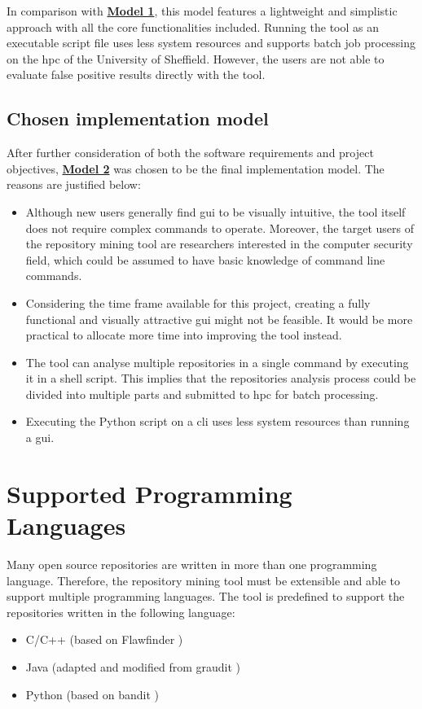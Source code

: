 \documentclass[12pt, a4paper]{report}
\begin{document}
In comparison with \hyperref[subsec:model1]{\textbf{Model 1}}, this model features a lightweight and
simplistic approach with all the core functionalities included. Running the tool as an executable
script file uses less system resources and supports batch job processing on the \acrshort{hpc} of
the University of Sheffield. However, the users are not able to evaluate false positive results
directly with the tool.

\subsection{Chosen implementation model} \label{subsec:chosen_model}
After further consideration of both the software requirements and project objectives,
\hyperref[subsec:model2]{\textbf{Model 2}} was chosen to be the final implementation model. The
reasons are justified below:
\begin{itemize}
  \item Although new users generally find \acrshort{gui} to be visually intuitive, the tool itself
  does not require complex commands to operate. Moreover, the target users of the repository mining
  tool are researchers interested in the computer security field, which could be assumed to have
  basic knowledge of command line commands.
  \item Considering the time frame available for this project, creating a fully functional and
  visually attractive \acrshort{gui} might not be feasible. It would be more practical to allocate
  more time into improving the tool instead.
  \item The tool can analyse multiple repositories in a single command by executing it in a shell
  script. This implies that the repositories analysis process could be divided into multiple parts
  and submitted to \acrshort{hpc} for batch processing.
  \item Executing the Python script on a \acrshort{cli} uses less system resources than running a
  \acrshort{gui}.
\end{itemize}

\section{Supported Programming Languages} \label{sec:supported_prog_lang}
Many open source repositories are written in more than one programming language. Therefore, the
repository mining tool must be extensible and able to support multiple programming languages. The
tool is predefined to support the repositories written in the following language:
\begin{itemize}
  \item C/C++ (based on Flawfinder \cite{flawfinder})
  \item Java (adapted and modified from graudit \cite{graudit})
  \item Python (based on bandit \cite{bandit})
\end{itemize}
\end{document}
